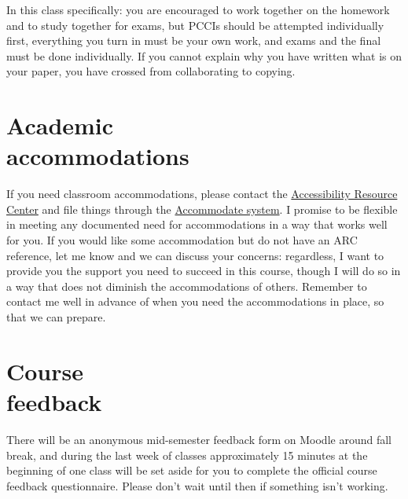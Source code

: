 \medskip
In this class specifically: you are encouraged to work together on the
homework and to study together for exams, but PCCIs should be attempted
individually first, everything you turn in must be your own work, and
exams and the final must be done individually. If you cannot explain why
you have written what is on your paper, you have crossed from
collaborating to copying.

\bigskip

\section{Academic \\ accommodations}
%
If you need classroom accommodations, please contact the
\href{mailto:ARC@smith.edu}{Accessibility Resource Center} and file
things through the
\href{https://smith-accommodate.symplicity.com/}{Accommodate system}. I
promise to be flexible in meeting any documented need for accommodations
in a way that works well for you. If you would like some accommodation
but do not have an ARC reference, let me know and we can discuss your
concerns: regardless, I want to provide you the support you need to
succeed in this course, though I will do so in a way that does not
diminish the accommodations of others. Remember to contact me well in
advance of when you need the accommodations in place, so that we can
prepare.

\bigskip

\section{Course \\ feedback}
%
There will be an anonymous mid-semester feedback form on Moodle around
fall break, and during the last week of classes approximately 15 minutes
at the beginning of one class will be set aside for you to complete the
official course feedback questionnaire. Please don't wait until then if
something isn't working.

\bigskip

%
